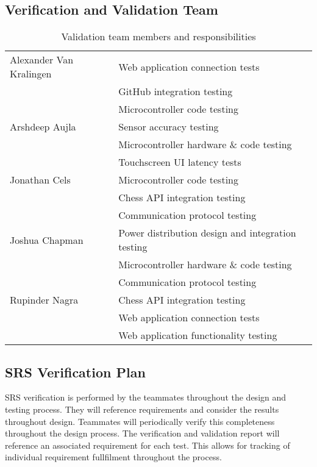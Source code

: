 \documentclass[12pt, titlepage]{article}
\begin{document}
\subsection{Verification and Validation Team}
\begin{table}[hp]
  \caption{Validation team members and responsibilities}
  \begin{tabular}{ |p{4.5cm}||p{9cm}|  }
    \hline
    Alexander Van Kralingen & Web application connection tests\\
    & GitHub integration testing\\
    & Microcontroller code testing\\
    \hline
    Arshdeep Aujla & Sensor accuracy testing\\
    & Microcontroller hardware \& code testing\\
    & Touchscreen UI latency tests\\
    \hline
    Jonathan Cels & Microcontroller code testing\\
    & Chess API integration testing\\
    & Communication protocol testing\\
    \hline
    Joshua Chapman& Power distribution design and integration testing\\
    & Microcontroller hardware \& code testing\\
    & Communication protocol testing\\
    \hline
    Rupinder Nagra & Chess API integration testing\\ 
    & Web application connection tests\\
    & Web application functionality testing\\
    \hline
  \end{tabular}
\end{table}

\subsection{SRS Verification Plan}
SRS verification is performed by the teammates throughout the design and testing 
process. They will reference requirements and consider the results throughout design. 
Teammates will periodically verify this completeness throughout the design process. 
The verification and validation report will reference an associated requirement for 
each test. This allows for tracking of individual requirement fullfilment 
throughout the process. 
\end{document}
